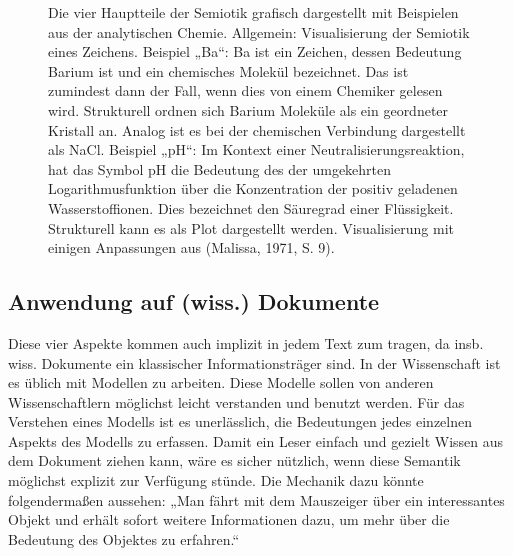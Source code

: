  
\begin{figure}[h!]
\centering
\advance\leftskip-2.5cm
\caption{ Die vier Hauptteile der Semiotik grafisch dargestellt mit Beispielen aus der analytischen Chemie. Allgemein: Visualisierung der Semiotik eines Zeichens. Beispiel „Ba“: Ba ist ein Zeichen, dessen Bedeutung Barium ist und ein chemisches Molekül bezeichnet. Das ist zumindest dann der Fall, wenn dies von einem Chemiker gelesen wird. Strukturell ordnen sich Barium Moleküle als ein geordneter Kristall an. Analog ist es bei der chemischen Verbindung dargestellt als NaCl. Beispiel „pH“: Im Kontext einer Neutralisierungsreaktion, hat das Symbol pH die Bedeutung des der umgekehrten Logarithmusfunktion über die Konzentration der positiv geladenen Wasserstoffionen. Dies bezeichnet den Säuregrad einer Flüssigkeit. Strukturell kann es als Plot dargestellt werden. Visualisierung mit einigen Anpassungen aus (Malissa, 1971, S. 9). }\label{semiotik}
\end{figure}
 
\subsection{Anwendung auf (wiss.) Dokumente}\label{}
 
Diese vier Aspekte kommen auch implizit in jedem Text zum tragen, da insb. wiss. Dokumente ein klassischer Informationsträger sind. In der Wissenschaft ist es üblich mit Modellen zu arbeiten. Diese Modelle sollen von anderen Wissenschaftlern möglichst leicht verstanden und benutzt werden. Für das Verstehen eines Modells ist es unerlässlich, die Bedeutungen jedes einzelnen Aspekts des Modells zu erfassen. Damit ein Leser einfach und gezielt Wissen aus dem Dokument ziehen kann, wäre es sicher nützlich, wenn diese Semantik möglichst explizit zur Verfügung stünde. Die Mechanik dazu könnte folgendermaßen aussehen: „Man fährt mit dem Mauszeiger über ein interessantes Objekt und erhält sofort weitere Informationen dazu, um mehr über die Bedeutung des Objektes zu erfahren.“

